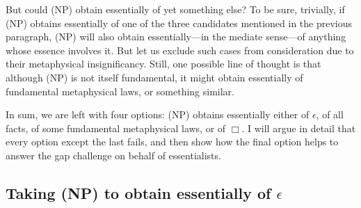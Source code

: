 \documentclass[12pt]{article}
\begin{document}
\par
But could (NP) obtain essentially of yet something else? To be sure, trivially, if (NP) obtains essentially of one of the three candidates mentioned in the previous paragraph, (NP) will also obtain essentially---in the mediate sense---of anything whose essence involves it. But let us exclude such cases from consideration due to their metaphysical insignificancy. Still, one possible line of thought is that although (NP) is not itself fundamental, it might obtain essentially of fundamental metaphysical laws, or something similar.
\par
In sum, we are left with four options: (NP) obtains essentially either of $\epsilon$, of all facts, of some fundamental metaphysical laws, or of $\Box$. I will argue in detail that every option except the last fails, and then show how the final option helps to answer the gap challenge on behalf of essentialists. 
\subsection{Taking (NP) to obtain essentially of $\epsilon$}
\end{document}
